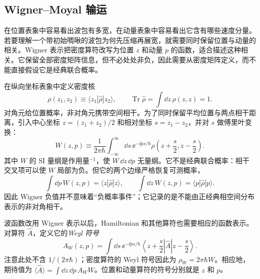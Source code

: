 


\subsection{Wigner--Moyal 输运}

在位置表象中容易看出波包有多宽，在动量表象中容易看出它含有哪些速度分量。若要理解一个带初始啁啾的波包为何先压缩再展宽，就需要同时保留位置与动量的相关。Wigner 表示把密度算符改写为位置 $z$ 和动量 $p$ 的函数，适合描述这种相关。它保留全部密度矩阵信息，但不必处处非负，因此需要从密度矩阵定义，而不能直接假设它是经典联合概率。

在纵向坐标表象中定义密度核
\[
\rho(z_1,z_2)\equiv\langle z_1|\hat\rho|z_2\rangle,
\qquad
\operatorname{Tr}\hat\rho=\int\dd z\,\rho(z,z)=1.
\]
对角元给位置概率，非对角元携带空间相干。为了同时保留平均位置与两点相干距离，引入中心坐标 $z=(z_1+z_2)/2$ 和相对坐标 $s=z_1-z_2$，并对 $s$ 做傅里叶变换：
\begin{equation}
\boxed{
W(z,p)
\equiv\frac{1}{2\pi\hbar}
\int_{-\infty}^{\infty}\dd s\,
\ee^{-\ii ps/\hbar}
\rho\!\left(z+\frac{s}{2},z-\frac{s}{2}\right).}
\label{eq:electron_wigner}
\end{equation}
其中 $W$ 的 SI 量纲是作用量$^{-1}$，使 $W\,\dd z\,\dd p$ 无量纲。它不是经典联合概率：相干交叉项可以使 $W$ 局部为负。但它的两个边缘严格恢复可测概率，
\begin{equation}
\boxed{
\int\dd p\,W(z,p)=\langle z|\hat\rho|z\rangle,
\qquad
\int\dd z\,W(z,p)=\langle p|\hat\rho|p\rangle.}
\label{eq:wigner_marginals}
\end{equation}
因此 Wigner 负值并不意味着“负概率事件”；它记录的是不能由正经典相空间分布表示的非对角相干。

波函数改用 Wigner 表示以后，Hamiltonian 和其他算符也需要相应的函数表示。对算符 $\hat A$，定义它的\emph{Weyl 符号}
\[
A_W(z,p)=\int\dd s\,\ee^{-\ii ps/\hbar}
\left\langle z+\frac{s}{2}\right|\hat A\left|z-\frac{s}{2}\right\rangle.
\]
注意此处不含 $1/(2\pi\hbar)$；密度算符的 Weyl 符号因此为 $\rho_W=2\pi\hbar W$。相应地，期待值为 $\langle\hat A\rangle=\int\dd z\,\dd p\,A_W W$。位置和动量算符的符号分别就是 $z$ 和 $p$。

